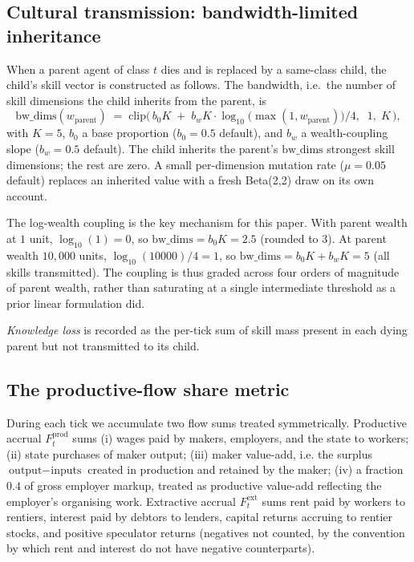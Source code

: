 \documentclass[11pt]{article}
\begin{document}
\subsection{Cultural transmission: bandwidth-limited inheritance}
\label{sec:transmission}

When a parent agent of class $t$ dies and is replaced by a
same-class child, the child's skill vector is constructed as follows.
The bandwidth, i.e.\ the number of skill dimensions the child
inherits from the parent, is
\begin{equation}
\text{bw\_dims}(w_{\text{parent}}) \;=\; \text{clip}\!\Big(\,
b_0 K \;+\; b_w K \cdot \log_{10}\!\big(\max(1, w_{\text{parent}})\big) / 4,
\;\; 1, \; K \,\Big),
\label{eq:bandwidth}
\end{equation}
with $K=5$, $b_0$ a base proportion ($b_0 = 0.5$ default), and $b_w$
a wealth-coupling slope ($b_w = 0.5$ default). The child inherits
the parent's $\text{bw\_dims}$ strongest skill dimensions; the rest
are zero. A small per-dimension mutation rate ($\mu = 0.05$ default)
replaces an inherited value with a fresh Beta(2,2) draw on its own
account.

The log-wealth coupling is the key mechanism for this paper. With
parent wealth at $1$ unit, $\log_{10}(1) = 0$, so $\text{bw\_dims}
= b_0 K = 2.5$ (rounded to 3). At parent wealth $10{,}000$ units,
$\log_{10}(10000)/4 = 1$, so $\text{bw\_dims} = b_0 K + b_w K = 5$
(all skills transmitted). The coupling is thus graded across four
orders of magnitude of parent wealth, rather than saturating at a
single intermediate threshold as a prior linear formulation did.

\emph{Knowledge loss} is recorded as the per-tick sum of skill mass
present in each dying parent but not transmitted to its child.

\subsection{The productive-flow share metric}
\label{sec:phi}

During each tick we accumulate two flow sums treated symmetrically.
Productive accrual $F^\text{prod}_t$ sums (i) wages paid by makers,
employers, and the state to workers; (ii) state purchases of maker
output; (iii) maker value-add, i.e. the surplus $\text{output} -
\text{inputs}$ created in production and retained by the maker;
(iv) a fraction $0.4$ of gross employer markup, treated as productive
value-add reflecting the employer's organising work. Extractive
accrual $F^\text{ext}_t$ sums rent paid by workers to rentiers,
interest paid by debtors to lenders, capital returns accruing to
rentier stocks, and positive speculator returns (negatives not
counted, by the convention by which rent and interest do not have
negative counterparts).
\end{document}

